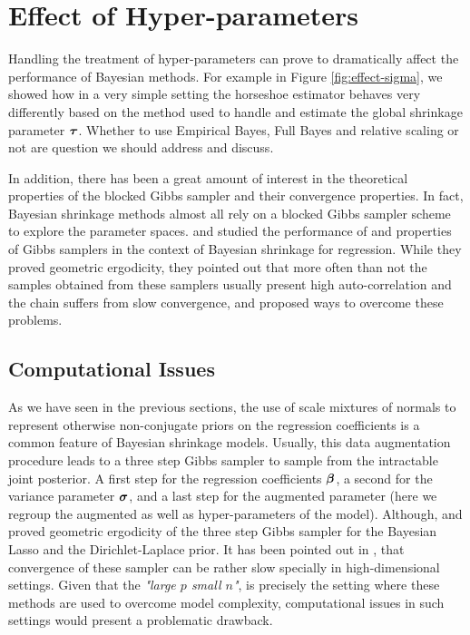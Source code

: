 \documentclass[chapters]{uamaththesis}
\begin{document}
\section{Effect of Hyper-parameters}


Handling the treatment of hyper-parameters can prove to dramatically affect the performance of Bayesian  methods. For example in Figure \ref{fig:effect-sigma}, we showed how in a very simple setting the horseshoe estimator behaves very differently based on the method used to handle and estimate the global shrinkage parameter $\boldsymbol{\tau}$. Whether to use Empirical Bayes, Full Bayes and relative scaling or not are question we should address and discuss.

In addition, there has been a great amount of interest in the theoretical properties of the blocked Gibbs sampler and their convergence properties. In fact, Bayesian shrinkage methods almost all rely on a blocked Gibbs sampler scheme to explore the parameter spaces. \cite{Rajaratnam2017Gibbs} and \cite{Khare2014ergodicity} studied the performance of and properties of Gibbs samplers in the context   of Bayesian shrinkage for regression. While they proved geometric ergodicity, they  pointed out that more often than not the samples obtained from these samplers usually present high auto-correlation and the chain suffers from slow convergence, and proposed   ways to overcome these problems.

\subsection{Computational Issues}

As we have seen in the previous sections, the use of scale mixtures of normals to represent otherwise non-conjugate priors on the regression coefficients is a common feature of Bayesian shrinkage models. Usually, this data augmentation procedure leads to a three step Gibbs sampler to sample from the intractable joint posterior. A first step for the regression coefficients $\boldsymbol{\beta}$, a second for the variance parameter $\boldsymbol{\sigma}$, and a last step for the augmented parameter (here we regroup the augmented as well as hyper-parameters of the model). Although, \cite{Khare2013blasso_ergodicity} and \cite{Khare2014ergodicity} proved geometric ergodicity of the three step Gibbs sampler for the Bayesian Lasso and the Dirichlet-Laplace prior. It has been pointed out in \cite{Rajaratnam2017Gibbs}, that convergence of these sampler can be rather slow specially in high-dimensional settings. Given that the \textit{"large $p$ small $n$"}, is precisely the setting where these methods are used to overcome model complexity, computational issues in such settings would present a problematic drawback. 
\end{document}
